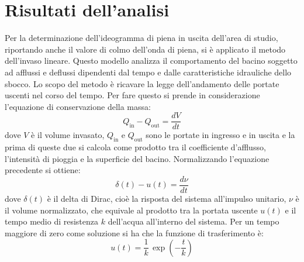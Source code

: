 \section{Risultati dell'analisi}
Per la determinazione dell'ideogramma di piena in uscita dell'area di studio, riportando anche il valore di colmo dell'onda di piena, si è applicato il metodo dell'invaso lineare. 
Questo modello analizza il comportamento del bacino soggetto ad afflussi e deflussi dipendenti dal tempo e dalle caratteristiche idrauliche dello sbocco.
Lo scopo del metodo è ricavare la legge dell'andamento delle portate uscenti nel corso del tempo.
Per fare questo si prende in considerazione l'equazione di conservazione della massa:
\begin{equation}
    Q_\text{in} - Q_\text{out} = \frac{dV}{dt}
\end{equation}
dove $V$ è il volume invasato, $Q_\text{in}$ e $Q_\text{out}$ sono le portate in ingresso e in uscita e la prima di queste due si calcola come prodotto tra il coefficiente d’afflusso, l’intensità di pioggia e la superficie del bacino.
Normalizzando l'equazione precedente si ottiene:
\begin{equation}
    \delta(t) - u(t) = \frac{d\nu}{dt}
\end{equation}
dove $\delta(t)$ è il delta di Dirac, cioè la risposta del sistema all'impulso unitario, $\nu$ è il volume normalizzato, che equivale al prodotto tra la portata uscente $u(t)$ e il tempo medio di resistenza $k$ dell'acqua all'interno del sistema.
Per un tempo maggiore di zero come soluzione si ha che la funzione di trasferimento è:
\begin{equation}
    u(t) = \frac{1}{k} \, \exp{\left(-\frac{t}{k}\right)}
\end{equation}
%
